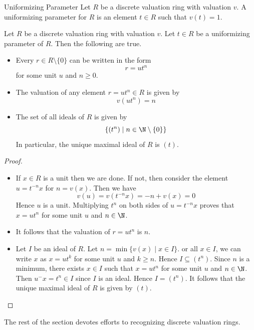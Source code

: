 \documentclass[a4paper]{article}
\begin{document}
\begin{defn}{Uniformizing Parameter}{} Let $R$ be a discrete valuation ring with valuation $v$. A uniformizing parameter for $R$ is an element $t\in R$ such that $v(t)=1$. 
\end{defn}

\begin{prp}{}{} Let $R$ be a discrete valuation ring with valuation $v$. Let $t\in R$ be a uniformizing parameter of $R$. Then the following are true. 
\begin{itemize}
\item Every $r\in R\setminus\{0\}$ can be written in the form $$r=ut^n$$ for some unit $u$ and $n\geq 0$. 
\item The valuation of any element $r=ut^n\in R$ is given by $$v(ut^n)=n$$
\item The set of all ideals of $R$ is given by $$\{(t^n)\;|\;n\in\N\setminus\{0\}\}$$ In particular, the unique maximal ideal of $R$ is $(t)$. 
\end{itemize} 
\begin{proof}\\
\begin{itemize}
\item If $x\in R$ is a unit then we are done. If not, then consider the element $u=t^{-n}x$ for $n=v(x)$. Then we have $$v(u)=v(t^{-n}x)=-n+v(x)=0$$ Hence $u$ is a unit. Multiplying $t^n$ on both sides of $u=t^{-n}x$ proves that $x=ut^n$ for some unit $u$ and $n\in\N$. 
\item It follows that the valuation of $r=ut^n$ is $n$. 
\item Let $I$ be an ideal of $R$. Let $n=\min\{v(x)\;|\;x\in I\}$. or all $x\in I$, we can write $x$ as $x=ut^k$ for some unit $u$ and $k\geq n$. Hence $I\subseteq(t^n)$. Since $n$ is a minimum, there exists $x\in I$ such that $x=ut^n$ for some unit $u$ and $n\in\N$. Then $u^{-}x=t^n\in I$ since $I$ is an ideal. Hence $I=(t^n)$. It follows that the unique maximal ideal of $R$ is given by $(t)$. 
\end{itemize}
\end{proof}
\end{prp}

The rest of the section devotes efforts to recognizing discrete valuation rings. 
\end{document}
